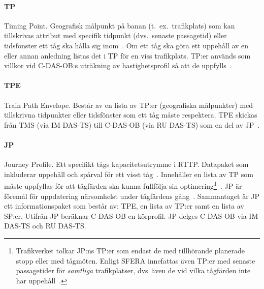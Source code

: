 \paragraph{TP}
Timing Point.
Geografisk målpunkt på banan (t.~ex.~trafikplats) som kan tillskrivas attribut med specifik tidpunkt (dvs.~senaste passagetid) eller tidsfönster ett tåg ska hålla sig inom~\cite{Olsson2023}.
Om ett tåg ska göra ett uppehåll av en eller annan anledning listas det i TP för en viss trafikplats.
TP:er används som villkor vid C-DAS-OB:s uträkning av hastighetsprofil så att de uppfylls~\cite{Olsson2023}.
\paragraph{TPE}
Train Path Envelope.
Består av en lista av TP:er (geografiska målpunkter) med tillskrivna tidpunkter eller tidsfönster som ett tåg måste respektera.
TPE skickas från TMS (via IM DAS-TS) till C-DAS-OB (via RU DAS-TS) som en del av JP~\cite{Olsson2023}.
\paragraph{JP}
Journey Profile.
Ett specifikt tågs kapacitetsutrymme i RTTP.
Datapaket som inkluderar uppehåll och spårval för ett visst tåg~\cite{Olsson2023}.
Innehåller en lista av TP som måste uppfyllas för att tågfärden ska kunna fullfölja sin optimering\footnote{Trafikverket tolkar JP:ns TP:er som endast de med tillhörande planerade stopp eller med tågmöten. Enligt SFERA innefattas även TP:er med senaste passagetider för \emph{samtliga} trafikplatser, dvs~även de vid vilka tågfärden inte har uppehåll~\cite{Joborn2023}.}~\cite{Olsson2023}.
JP är föremål för uppdatering närsomhelst under tågfärdens gång~\cite{Olsson2023}.
Sammantaget är JP ett informationspaket som består av: TPE, en lista av TP:er samt en lista av SP:er.
Utifrån JP beräknar C-DAS-OB en körprofil.
JP delges C-DAS OB via IM DAS-TS och RU DAS-TS\@.
